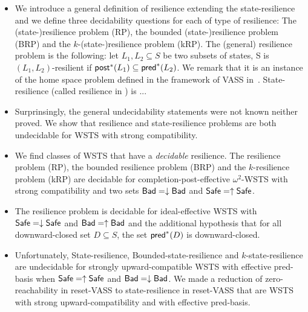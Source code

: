 \begin{itemize}

\item We introduce a general definition of resilience extending the state-resilience \cite{DBLP:journals/corr/PrasadZ16,DBLP:journals/corr/abs-2108-00889,DBLP:conf/gg/Ozkan22} and we define three decidability questions for each of type of resilience: The (state-)resilience problem (RP), the bounded (state-)resilience problem (BRP)
and the $k$-(state-)resilience problem (kRP). The (general) resilience problem is the following: let $L_1,L_2 \subseteq S$ be two subsets of states, S is $(L_1,L_2)$-resilient if $\textsf{post}^*(L_1)	\subseteq \textsf{pred}^*(L_2)$. We remark that it is an instance of the home space problem defined in the framework of VASS in~\cite{DBLP:journals/corr/abs-2207-02697}.
State-resilience (called resilience in \cite{DBLP:journals/corr/PrasadZ16,DBLP:journals/corr/abs-2108-00889,DBLP:conf/gg/Ozkan22}) is ...

\item Surprinsingly, the general undecidability statements were not known neither proved. We show that resilience and state-resilience problems are both undecidable for WSTS with strong compatibility. 


\item We find classes of WSTS that have a \emph{decidable} resilience. The resilience problem (RP), the bounded resilience problem (BRP)
and the $k$-resilience problem (kRP) are decidable for completion-post-effective $\omega^2$-WSTS with strong compatibility and two sets $\textsf{Bad} = \downarrow \textsf{Bad}$ and $\textsf{Safe} = \uparrow \textsf{Safe}$.

\item The resilience problem is decidable for ideal-effective WSTS with 
$\textsf{Safe}=\downarrow \textsf{Safe}$
and $\textsf{Bad}=\uparrow \textsf{Bad}$
and
the additional hypothesis that
for all downward-closed set $D \subseteq S$, the set $\textsf{pred}^*(D)$ is downward-closed.

\item Unfortunately, {\sc State-resilience},
{\sc Bounded-state-resilience} and
{\sc $k$-state-resilience}
are undecidable for strongly upward-compatible WSTS with effective pred-basis
when
$\textsf{Safe}=\uparrow \textsf{Safe}$
and $\textsf{Bad}=\downarrow \textsf{Bad}$. We made a reduction of zero-reachability in reset-VASS to state-resilience in reset-VASS that are WSTS with strong upward-compatibility and with effective pred-basis.


\end{itemize}
